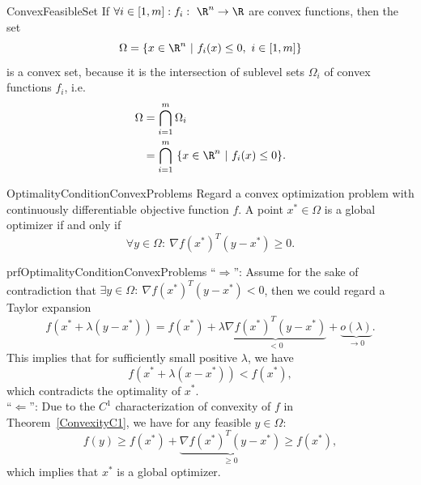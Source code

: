 \begin{ex}{ConvexFeasibleSet}
    If $\forall i \in [1,m]: f_i : \ \R^n \rightarrow \R$ are convex functions, then the set 
    \begin{equation*}
        \Omega = \{x \in \R^n \ | \ f_i(x) \leq 0, \ i \in [1,m]\}
    \end{equation*}
    is a convex set, because it is the intersection of sublevel sets $\Omega_i$ of convex functions $f_i$, i\@.e\@.
    \begin{align*}
        \Omega 
            &= \bigcap_{i=1}^m \Omega_i \\
            &= \bigcap_{i=1}^m \ \{x \in \R^n \ | \ f_i(x) \leq 0 \}.
    \end{align*}
    \vspace{-0.5cm}
\end{ex}


\begin{theo}{OptimalityConditionConvexProblems}
    Regard a convex optimization problem with continuously differentiable objective function $f$. A point $x^* \in \Omega$ is a global optimizer if and only if 
    \begin{equation*}
        \forall y \in \Omega: \ \nabla {f(x^*)}^T(y - x^*) \geq 0.
    \end{equation*} 
    \vspace*{-0.5cm}
\end{theo}

\begin{prf}{prfOptimalityConditionConvexProblems}
    ``$\Rightarrow$'': Assume for the sake of contradiction that $\exists y \in \Omega: \ \nabla {f(x^*)}^T(y - x^*) < 0$, then we could regard a Taylor expansion
    \begin{equation*}
        f(x^* + \lambda(y - x^*)) = f(x^*) + \lambda \underbrace{\nabla {f(x^*)}^T(y - x^*)}_{<0} + \underbrace{o(\lambda)}_{\rightarrow 0}.
    \end{equation*}
   This implies that for sufficiently small positive $\lambda$, we have 
   \begin{equation*}
        f(x^* + \lambda(x - x^*)) < f(x^*),
   \end{equation*}
   which contradicts the optimality of $x^*$. \\

    ``$\Leftarrow$'': 
   Due to the $C^1$ characterization of convexity of $f$ in Theorem~\ref{ConvexityC1}, we have for any feasible $y \in \Omega$: 
   \begin{equation*}
       f(y) \geq f(x^*) + \underbrace{\nabla {f(x^*)}^T(y - x^*)}_{\geq 0} \geq f(x^*),
   \end{equation*}
   which implies that $x^*$ is a global optimizer.
\end{prf}  

